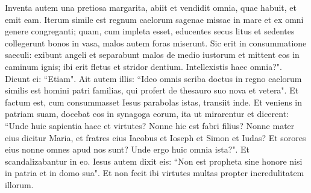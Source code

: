 \begin{biblechapter}
\verse Inventa autem una pretiosa margarita, abiit et vendidit omnia, quae habuit, et emit eam. 
\verse Iterum simile est regnum caelorum sagenae missae in mare et ex omni genere congreganti; 
\verse quam, cum impleta esset, educentes secus litus et sedentes collegerunt bonos in vasa, malos autem foras miserunt. 
\verse Sic erit in consummatione saeculi: exibunt angeli et separabunt malos de medio iustorum  
\verse et mittent eos in caminum ignis; ibi erit fletus et stridor dentium. 
\verse Intellexistis haec omnia?". Dicunt ei: “Etiam". 
\verse Ait autem illis: “Ideo omnis scriba doctus in regno caelorum similis est homini patri familias, qui profert de thesauro suo nova et vetera". 
\verse Et factum est, cum consummasset Iesus parabolas istas, transiit inde. 
\verse Et veniens in patriam suam, docebat eos in synagoga eorum, ita ut mirarentur et dicerent: “Unde huic sapientia haec et virtutes? 
\verse Nonne hic est fabri filius? Nonne mater eius dicitur Maria, et fratres eius Iacobus et Ioseph et Simon et Iudas? 
\verse Et sorores eius nonne omnes apud nos sunt? Unde ergo huic omnia ista?". 
\verse Et scandalizabantur in eo. Iesus autem dixit eis: “Non est propheta sine honore nisi in patria et in domo sua". 
\verse Et non fecit ibi virtutes multas propter incredulitatem illorum. 
\end{biblechapter}

